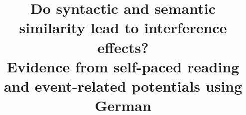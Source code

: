 \documentclass[review,preprint,12pt,authoryear,floatsintext]{elsarticle}
\begin{document}
\begin{frontmatter}
\title{Do syntactic and semantic similarity lead to interference effects?\\
Evidence from self-paced reading and event-related potentials using German}







\end{frontmatter}
\end{document}
